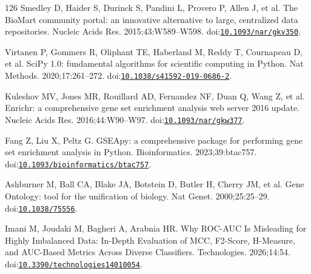\begin{thebibliography}{126}
Smedley D, Haider S, Durinck S, Pandini L, Provero P, Allen J, et al. The BioMart community portal: an innovative alternative to large, centralized data repositories. Nucleic Acids Res. 2015;43:W589--W598. doi:\href{https://doi.org/10.1093/nar/gkv350}{\nolinkurl{10.1093/nar/gkv350}}.

Virtanen P, Gommers R, Oliphant TE, Haberland M, Reddy T, Cournapeau D, et al. SciPy 1.0: fundamental algorithms for scientific computing in Python. Nat Methods. 2020;17:261--272. doi:\href{https://doi.org/10.1038/s41592-019-0686-2}{\nolinkurl{10.1038/s41592-019-0686-2}}.

Kuleshov MV, Jones MR, Rouillard AD, Fernandez NF, Duan Q, Wang Z, et al. Enrichr: a comprehensive gene set enrichment analysis web server 2016 update. Nucleic Acids Res. 2016;44:W90--W97. doi:\href{https://doi.org/10.1093/nar/gkw377}{\nolinkurl{10.1093/nar/gkw377}}.

Fang Z, Liu X, Peltz G. GSEApy: a comprehensive package for performing gene set enrichment analysis in Python. Bioinformatics. 2023;39:btac757. doi:\href{https://doi.org/10.1093/bioinformatics/btac757}{\nolinkurl{10.1093/bioinformatics/btac757}}.

Ashburner M, Ball CA, Blake JA, Botstein D, Butler H, Cherry JM, et al. Gene Ontology: tool for the unification of biology. Nat Genet. 2000;25:25--29. doi:\href{https://doi.org/10.1038/75556}{\nolinkurl{10.1038/75556}}.

Imani M, Joudaki M, Bagheri A, Arabnia HR. Why ROC-AUC Is Misleading for Highly Imbalanced Data: In-Depth Evaluation of MCC, F2-Score, H-Measure, and AUC-Based Metrics Across Diverse Classifiers. Technologies. 2026;14:54. doi:\href{https://doi.org/10.3390/technologies14010054}{\nolinkurl{10.3390/technologies14010054}}.

\end{thebibliography}
\endgroup

